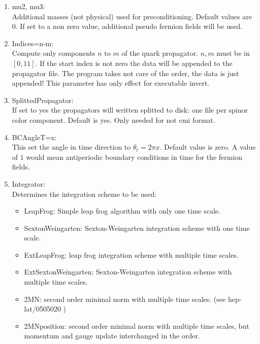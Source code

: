 \begin{enumerate}
\item {\ttfamily mu2, mu3}:\\
  Additional masses (not physical) used for preconditioning. Default values are
  $0$. If set to a non zero value, additional pseudo fermion fields
  will be used.

\item {\ttfamily Indices=n-m}:\\
  Compute only components $n$ to $m$ of the quark propagator. $n,m$ must
  be in $[0,11]$. If the start index is not zero the data will be
  appended to the propagator file. The program takes not care of the
  order, the data is just appended! This parameter has only
  effect for executable {\ttfamily invert}.

\item {\ttfamily SplittedPropagator}:\\
  If set to yes the propagators will written splitted to disk: one
  file per spinor color component. Default is {\ttfamily yes}. Only
  needed for not cmi format.

\item {\ttfamily BCAngleT=x}:\\
  This set the angle in
  time direction to $\theta_t = 2\pi x$. Default value is
  zero. A value of $1$ would mean antiperiodic boundary conditions in
  time for the fermion fields.

\item {\ttfamily Integrator}:\\
  Determines the integration scheme to be used:
  \begin{itemize}
  \item {\ttfamily LeapFrog}: Simple leap frog algorithm with only one
    time scale. 
  \item {\ttfamily SextonWeingarten}: Sexton-Weingarten integration
    scheme with one time scale.
  \item {\ttfamily ExtLeapFrog}: leap frog integration scheme with
    multiple time scales.
  \item {\ttfamily ExtSextonWeingarten}: Sexton-Weingarten integration scheme with
    multiple time scales.
  \item {\ttfamily 2MN}: second order minimal norm with multiple time
    scales. (see {\ttfamily hep-lat/0505020} )
  \item {\ttfamily 2MNposition}: second order minimal norm with
    multiple time scales, but momentum and gauge update interchanged
    in the order.
  \end{itemize}


\end{enumerate}
